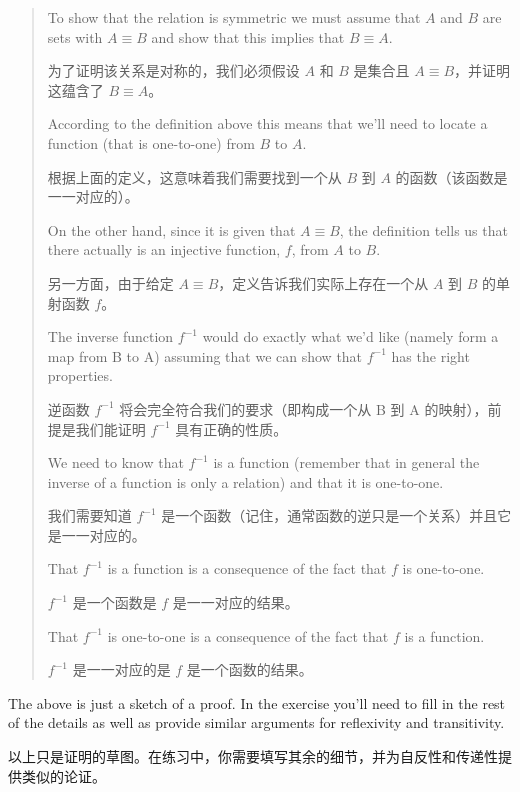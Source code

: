 \begin{quote}
    To show that the relation is symmetric we must assume that $A$
    and $B$ are sets with $A \equiv B$ and show that this implies that
    $B \equiv A$.

    为了证明该关系是对称的，我们必须假设 $A$ 和 $B$ 是集合且 $A \equiv B$，并证明这蕴含了 $B \equiv A$。

    According to the definition above this means that we'll
    need to locate a function (that is one-to-one) from $B$ to $A$.

    根据上面的定义，这意味着我们需要找到一个从 $B$ 到 $A$ 的函数（该函数是一一对应的）。

    On
    the other hand, since it is given that $A \equiv B$, the definition tells
    us that there actually is an injective function, $f$, from $A$ to $B$.

    另一方面，由于给定 $A \equiv B$，定义告诉我们实际上存在一个从 $A$ 到 $B$ 的单射函数 $f$。

    The inverse function $f^{-1}$ would do exactly what we'd like (namely
    form a map from B to A) assuming that we can show that $f^{-1}$
    has the right properties.

    逆函数 $f^{-1}$ 将会完全符合我们的要求（即构成一个从 B 到 A 的映射），前提是我们能证明 $f^{-1}$ 具有正确的性质。

    We need to know that $f^{-1}$ is a function
    (remember that in general the inverse of a function is only a
    relation) and that it is one-to-one.

    我们需要知道 $f^{-1}$ 是一个函数（记住，通常函数的逆只是一个关系）并且它是一一对应的。

    That $f^{-1}$ is a function is a
    consequence of the fact that $f$ is one-to-one.

    $f^{-1}$ 是一个函数是 $f$ 是一一对应的结果。

    That $f^{-1}$ is one-to-one
    is a consequence of the fact that $f$ is a function.

    $f^{-1}$ 是一一对应的是 $f$ 是一个函数的结果。

\end{quote}

The above is just a sketch of a proof.  In the exercise you'll need to fill
in the rest of the details as well as provide similar arguments for reflexivity
and transitivity.

以上只是证明的草图。在练习中，你需要填写其余的细节，并为自反性和传递性提供类似的论证。

